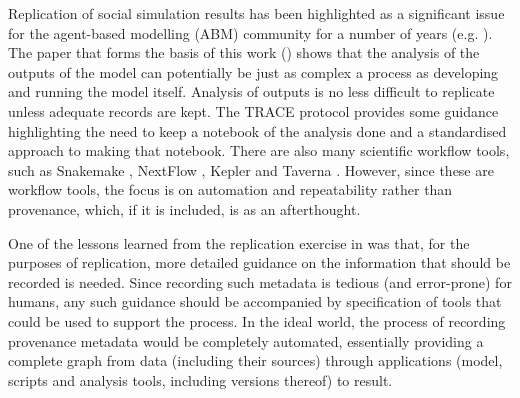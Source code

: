\documentclass[runningheads]{llncs}
\begin{document}
Replication of social simulation results has been highlighted as a significant
issue for the agent-based modelling (ABM) community for a number of years (e.g. \cite{edmonds2003replication}).
The paper that forms the basis of this work (\cite{polhill2017lessons}) shows that
the analysis of the outputs of the model can potentially be just as complex a
process as developing and running the model itself. Analysis of outputs is no less difficult
to replicate unless adequate records are kept. The TRACE protocol \cite{schmolke2010ecological,ayllon2021keeping} provides
some guidance highlighting the need to keep a notebook of the analysis done and
a standardised approach to making that notebook. There are also 
many scientific workflow tools, such as Snakemake
\cite{koster2012snakemake}, NextFlow \cite{di2017nextflow}, Kepler
\cite{ludascher2006scientific} and Taverna \cite{hull2006taverna}. However, since
these are workflow tools, the focus is on automation and
repeatability rather than provenance, which, if it is included, is as an afterthought.

One of the lessons learned from the replication exercise in
\cite{polhill2017lessons} was that, for the purposes of replication, more
detailed guidance on the information that should be recorded is needed. Since
recording such metadata is tedious (and error-prone) for humans, any such
guidance should be accompanied by specification of tools
that could be used to support the process. In the ideal world, the process
of recording provenance metadata would be completely automated, essentially providing a complete graph from data (including their sources) through applications (model, scripts and analysis tools, including versions thereof) to result.
\end{document}
